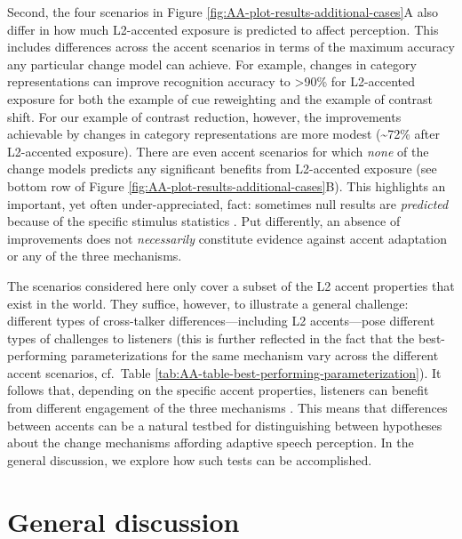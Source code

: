 \documentclass[
  11pt,
  man,floatsintext]{apa6}
\begin{document}
Second, the four scenarios in Figure \ref{fig:AA-plot-results-additional-cases}A also differ in how much L2-accented exposure is predicted to affect perception. This includes differences across the accent scenarios in terms of the maximum accuracy any particular change model can achieve. For example, changes in category representations can improve recognition accuracy to \textgreater90\% for L2-accented exposure for both the example of cue reweighting and the example of contrast shift. For our example of contrast reduction, however, the improvements achievable by changes in category representations are more modest (\textasciitilde72\% after L2-accented exposure). There are even accent scenarios for which \emph{none} of the change models predicts any significant benefits from L2-accented exposure (see bottom row of Figure \ref{fig:AA-plot-results-additional-cases}B). This highlights an important, yet often under-appreciated, fact: sometimes null results are \emph{predicted} because of the specific stimulus statistics \autocites[see][]{tan2021,zheng-samuel2020}. Put differently, an absence of improvements does not \emph{necessarily} constitute evidence against accent adaptation or any of the three mechanisms.

The scenarios considered here only cover a subset of the L2 accent properties that exist in the world. They suffice, however, to illustrate a general challenge: different types of cross-talker differences---including L2 accents---pose different types of challenges to listeners (this is further reflected in the fact that the best-performing parameterizations for the same mechanism vary across the different accent scenarios, cf.~Table \ref{tab:AA-table-best-performing-parameterization}). It follows that, depending on the specific accent properties, listeners can benefit from different engagement of the three mechanisms \autocite[and different rates of adaptation, see discussion of the flexibility-stability trade-off in][pp.~180-182]{kleinschmidt-jaeger2015}. This means that differences between accents can be a natural testbed for distinguishing between hypotheses about the change mechanisms affording adaptive speech perception. In the general discussion, we explore how such tests can be accomplished.

\section{General discussion}\label{sec:general-discussion}
\end{document}
